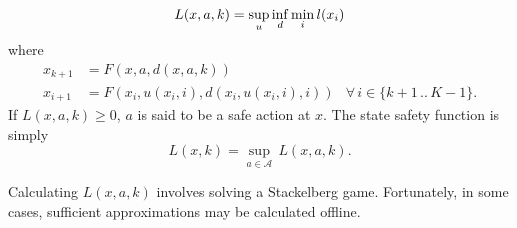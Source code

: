 \documentclass{article}
\newcommand{\aspace}{\ensuremath{\mathcal{A}} }
\begin{document}
\begin{equation}
    L(x, a, k) = \underset{u}{\sup}\,\underset{d}{\inf}\,\underset{i}{\min}\,l(x_i) \\
\end{equation}
where
\begin{equation*}
    \begin{aligned}
        x_{k+1} &= F(x, a, d(x, a, k)) \\
        x_{i+1} &= F(x_i, u(x_i, i), d(x_i, u(x_i, i), i)) & \forall\, i \in \{k+1\,..\,K-1\} \text{.}
    \end{aligned}
\end{equation*}
If $L(x, a, k) \geq 0$, $a$ is said to be a safe action at $x$. The state safety function is simply
\begin{equation}
    L(x, k) = \underset{a\in\aspace}{\sup}\,L(x,a,k) \text{.}
\end{equation}

Calculating $L(x,a,k)$ involves solving a Stackelberg game. Fortunately, in some cases, sufficient approximations may be calculated offline.

% 
% 


\end{document}
